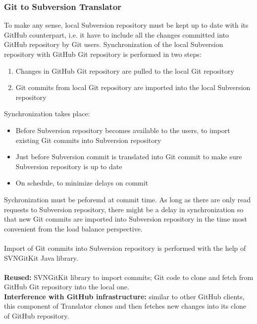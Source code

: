 \subsubsection{Git to Subversion Translator}
To make any sense, local Subversion repository must be kept up to date with its GitHub counterpart, i.e. it have to include all the changes committed into GitHub repository by Git users. Synchronization of the local Subversion repository with GitHub Git repository is performed in two steps:
\begin{enumerate}
\compactlist
\item Changes in GitHub Git repository are pulled to the local Git repository
\item Git commits from local Git repository are imported into the local Subversion repository
\end{enumerate} 
Synchronization takes place:
\begin{itemize}
\item Before Subversion repository becomes available to the users, to import existing Git commits into Subversion repository
\item Just before Subversion commit is translated into Git commit to make sure Subversion repository is up to date
\item On schedule, to minimize delays on commit
\end{itemize}
Sychronization must be peforemd at commit time. As long as there are only read requests 
to Subversion repository, there might be a delay in synchronization so that new Git
commits are imported into Subversion repository in the time most convenient from the 
load balance perspective.
\\\\
Import of Git commits into Subversion repository is performed with the help of SVNGitKit Java library.
\\\\
\textbf{Reused:} SVNGitKit library to import commits; Git code to clone and fetch from GitHub Git repository into the local one.\\
\textbf{Interference with GitHub infrastructure:} similar to other GitHub clients, this component of Translator clones and then fetches new changes into its clone of GitHub repository.

